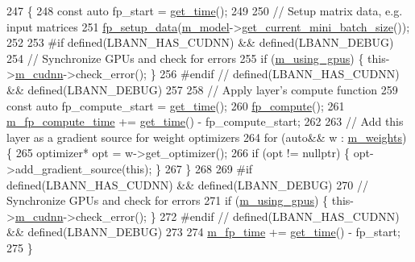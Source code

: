 \begin{DoxyCode}
247                          \{
248   \textcolor{keyword}{const} \textcolor{keyword}{auto} fp\_start = \hyperlink{namespacelbann_a478d36031ff0659893c4322cd856157f}{get\_time}();
249 
250   \textcolor{comment}{// Setup matrix data, e.g. input matrices}
251   \hyperlink{classlbann_1_1Layer_af311d901a5f71e4c749454647e9fd9c7}{fp\_setup\_data}(\hyperlink{classlbann_1_1Layer_a3d9315e99574166f2f33e37b572021d2}{m\_model}->\hyperlink{classlbann_1_1model_a3eaad8fd538b99ecab9afca6dc3327fd}{get\_current\_mini\_batch\_size}());
252 
253 \textcolor{preprocessor}{  #if defined(LBANN\_HAS\_CUDNN) && defined(LBANN\_DEBUG)}
254   \textcolor{comment}{// Synchronize GPUs and check for errors}
255   \textcolor{keywordflow}{if} (\hyperlink{classlbann_1_1Layer_af7881cb5eff5207c15fa835d65462e8f}{m\_using\_gpus}) \{ this->\hyperlink{classlbann_1_1Layer_a08dbb94239e3b8c96329786c57c72e21}{m\_cudnn}->check\_error(); \}
256 \textcolor{preprocessor}{  #endif // defined(LBANN\_HAS\_CUDNN) && defined(LBANN\_DEBUG)}
257 
258   \textcolor{comment}{// Apply layer's compute function}
259   \textcolor{keyword}{const} \textcolor{keyword}{auto} fp\_compute\_start = \hyperlink{namespacelbann_a478d36031ff0659893c4322cd856157f}{get\_time}();
260   \hyperlink{classlbann_1_1Layer_a523319dd1bd87a0612afa1912bb5aad7}{fp\_compute}();
261   \hyperlink{classlbann_1_1Layer_aa4e439c1d6a656e709dc4736c9380476}{m\_fp\_compute\_time} += \hyperlink{namespacelbann_a478d36031ff0659893c4322cd856157f}{get\_time}() - fp\_compute\_start;
262 
263   \textcolor{comment}{// Add this layer as a gradient source for weight optimizers}
264   \textcolor{keywordflow}{for} (\textcolor{keyword}{auto}&& w : \hyperlink{classlbann_1_1Layer_a7954e30fbf9100a6ba4b56d02767a469}{m\_weights}) \{
265     optimizer* opt = w->get\_optimizer();
266     \textcolor{keywordflow}{if} (opt != \textcolor{keyword}{nullptr}) \{ opt->add\_gradient\_source(\textcolor{keyword}{this}); \}
267   \}
268 
269 \textcolor{preprocessor}{  #if defined(LBANN\_HAS\_CUDNN) && defined(LBANN\_DEBUG)}
270   \textcolor{comment}{// Synchronize GPUs and check for errors}
271   \textcolor{keywordflow}{if} (\hyperlink{classlbann_1_1Layer_af7881cb5eff5207c15fa835d65462e8f}{m\_using\_gpus}) \{ this->\hyperlink{classlbann_1_1Layer_a08dbb94239e3b8c96329786c57c72e21}{m\_cudnn}->check\_error(); \}
272 \textcolor{preprocessor}{  #endif // defined(LBANN\_HAS\_CUDNN) && defined(LBANN\_DEBUG)}
273 
274   \hyperlink{classlbann_1_1Layer_ab1bd9ab0a6f9e554f4dc936d8316028e}{m\_fp\_time} += \hyperlink{namespacelbann_a478d36031ff0659893c4322cd856157f}{get\_time}() - fp\_start;
275 \}
\end{DoxyCode}
